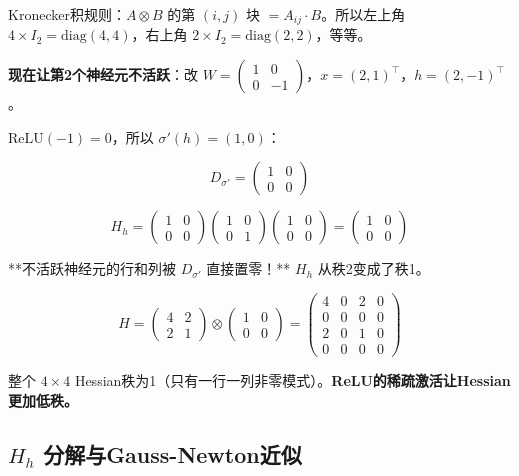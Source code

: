 \documentclass[12pt,a4paper]{article}
\begin{document}
Kronecker积规则：$A \otimes B$ 的第 $(i,j)$ 块 $= A_{ij} \cdot B$。所以左上角 $4 \times I_2 = \text{diag}(4,4)$，右上角 $2 \times I_2 = \text{diag}(2,2)$，等等。

\textbf{现在让第2个神经元不活跃}：改 $W = \begin{pmatrix}1&0\\0&-1\end{pmatrix}$，$x = (2,1)^\top$，$h = (2, -1)^\top$。

$\text{ReLU}(-1) = 0$，所以 $\sigma'(h) = (1, 0)$：


\[D_{\sigma'} = \begin{pmatrix}1&0\\0&0\end{pmatrix}\]


\[H_h = \begin{pmatrix}1&0\\0&0\end{pmatrix} \begin{pmatrix}1&0\\0&1\end{pmatrix} \begin{pmatrix}1&0\\0&0\end{pmatrix} = \begin{pmatrix}1&0\\0&0\end{pmatrix}\]

**不活跃神经元的行和列被 $D_{\sigma'}$ 直接置零！** $H_h$ 从秩2变成了秩1。


\[H = \begin{pmatrix}4&2\\2&1\end{pmatrix} \otimes \begin{pmatrix}1&0\\0&0\end{pmatrix} = \begin{pmatrix}4&0&2&0\\0&0&0&0\\2&0&1&0\\0&0&0&0\end{pmatrix}\]

整个 $4 \times 4$ Hessian秩为1（只有一行一列非零模式）。\textbf{ReLU的稀疏激活让Hessian更加低秩。}


\subsection{$H_h$ 分解与Gauss-Newton近似}
\end{document}
